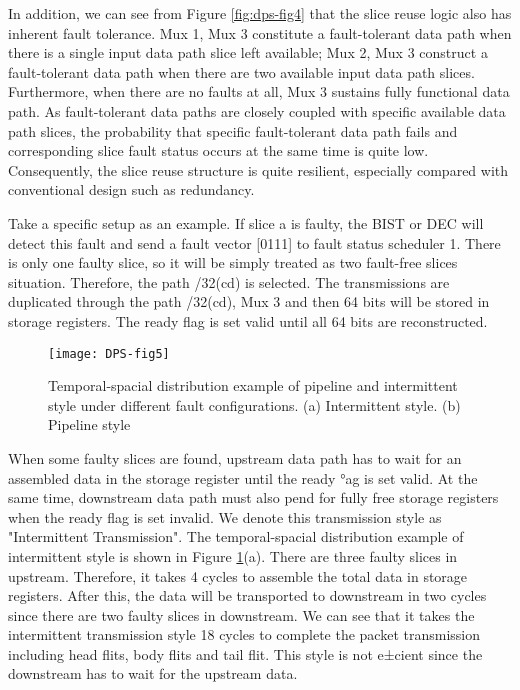 In addition, we can see from Figure \ref{fig:dps-fig4} that the slice reuse logic also has inherent fault tolerance. Mux 1, Mux 3 constitute a fault-tolerant data path when there is a single input data path slice left available; Mux 2, Mux 3 construct a fault-tolerant data path when there are two available input data path slices. Furthermore, when there are no faults at all, Mux 3 sustains fully functional data path. As fault-tolerant data paths are closely coupled with specific available data path slices, the probability that specific fault-tolerant data path fails and corresponding slice fault status occurs at the same time is quite low. Consequently, the slice reuse structure is quite resilient, especially compared with conventional design such as redundancy.

Take a specific setup as an example. If slice a is faulty, the BIST or DEC will detect this fault and send a fault vector [0111] to fault status scheduler 1. There is only one faulty slice, so it will be simply treated as two fault-free slices situation. Therefore, the path /32(cd) is selected. The transmissions are duplicated through the path /32(cd), Mux 3 and then 64 bits will be stored in storage registers. The ready flag is set valid until all 64 bits are reconstructed.

\begin{figure}[h]
      \centering
        \texttt{[image: DPS-fig5]}
        \caption{Temporal-spacial distribution example of pipeline and intermittent style under different fault configurations. (a) Intermittent style. (b) Pipeline style}
        \label{fig:dps-fig5}
\end{figure}


When some faulty slices are found, upstream data path has to wait for an assembled data in the storage register until the ready °ag is set valid. At the same time, downstream data path must also pend for fully free storage registers when the ready flag is set invalid. We denote this transmission style as "Intermittent Transmission". The temporal-spacial distribution example of intermittent style is shown in Figure \ref{fig:dps-fig5}(a). There are three faulty slices in upstream. Therefore, it takes 4 cycles to assemble the total data in storage registers. After this, the data will be transported to downstream in two cycles since there are two faulty slices in downstream. We can see that it takes the intermittent transmission style 18 cycles to complete the packet transmission including head flits, body flits and tail flit. This style is not e±cient since the downstream has to wait for the upstream data.

